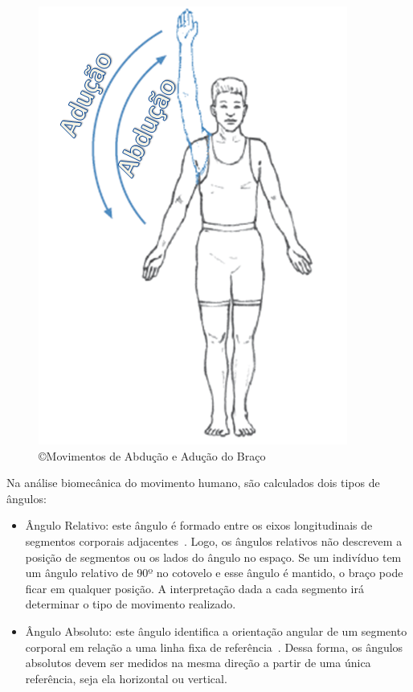 \begin{figure}
 \centering
 \includegraphics[scale=0.5]{./img/abducao.png}
\caption[Movimentos de Abdução e Adução do Braço]{\copyright Movimentos de Abdução e Adução do Braço~\cite{mcginnis2013biomechanics}}
 \label{fig:movabducaoaducao}
\end{figure}

Na análise biomecânica do movimento humano, são calculados dois tipos de ângulos:
	\begin{itemize}
		\item Ângulo Relativo: este ângulo é formado entre os eixos longitudinais de segmentos corporais adjacentes~\cite{hamill1999bases}. Logo, os ângulos relativos não descrevem a posição de segmentos ou os lados do ângulo no espaço. Se um indivíduo tem um ângulo relativo de 90º no cotovelo e esse ângulo é mantido, o braço pode ficar em qualquer posição. A interpretação dada a cada segmento irá determinar o tipo de movimento realizado. 
		\item Ângulo Absoluto: este ângulo identifica a orientação angular de um segmento corporal em relação a uma linha fixa de referência~\cite{hamill1999bases}. Dessa forma, os ângulos absolutos devem ser medidos na mesma direção a partir de uma única referência, seja ela horizontal ou vertical.
	\end{itemize}

